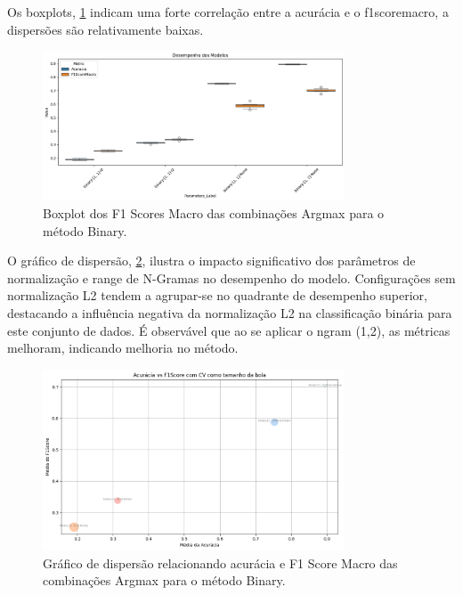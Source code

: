 Os boxplots, \ref{fig:boxplot_binary} indicam uma forte correlação entre a acurácia e o f1scoremacro, a dispersões são relativamente baixas. 
\begin{figure}[H]
    \centering
    \includegraphics[width=0.8\textwidth]{images/boxbinario.png}
    \caption{Boxplot dos F1 Scores Macro das combinações Argmax para o método Binary.}
    \label{fig:boxplot_binary}
\end{figure}

O gráfico de dispersão, \ref{fig:scatter_acuracia_f1score_binary}, ilustra o impacto significativo dos parâmetros de normalização e range de N-Gramas no desempenho do modelo. Configurações sem normalização L2 tendem a agrupar-se no quadrante de desempenho superior, destacando a influência negativa da normalização L2 na classificação binária para este conjunto de dados.  É observável que ao se aplicar o ngram (1,2), as métricas melhoram, indicando melhoria no método.

\begin{figure}[H]
    \centering
    \includegraphics[width=0.8\textwidth]{images/dispersaobinario.png}
    \caption{Gráfico de dispersão relacionando acurácia e F1 Score Macro das combinações Argmax para o método Binary.}
    \label{fig:scatter_acuracia_f1score_binary}
\end{figure}

